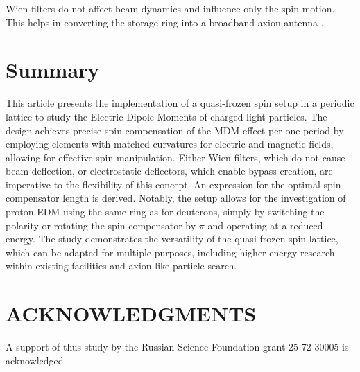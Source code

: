 \documentclass[submitting]{nst}
\begin{document}
\par Wien filters do not affect beam dynamics and influence only the spin motion. This helps in converting the storage ring into a broadband axion antenna \cite{axion, axion_nica}.

\section{Summary} \label{sec.V}

\par This article presents the implementation of a quasi-frozen spin setup in a periodic lattice to study the Electric Dipole Moments of charged light particles. The design achieves precise spin compensation of the MDM-effect per one period by employing elements with matched curvatures for electric and magnetic fields, allowing for effective spin manipulation. Either Wien filters, which do not cause beam deflection, or electrostatic deflectors, which enable bypass creation, are imperative to the flexibility of this concept. An expression for the optimal spin compensator length is derived. Notably, the setup allows for the investigation of proton EDM using the same ring as for deuterons, simply by switching the polarity or rotating the spin compensator by $\pi$ and operating at a reduced energy. The study demonstrates the versatility of the quasi-frozen spin lattice, which can be adapted for multiple purposes, including higher-energy research within existing facilities and axion-like particle search.

\section*{ACKNOWLEDGMENTS}

\par A support of thus study by the Russian Science Foundation grant 25-72-30005 is acknowledged.
\end{document}
